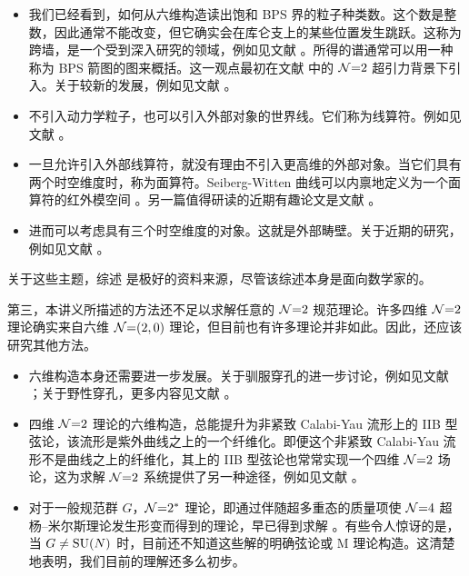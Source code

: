 \begin{itemize}
\item 我们已经看到，如何从六维构造读出饱和 BPS 界的粒子种类数。这个数是整数，因此通常不能改变，但它确实会在库仑支上的某些位置发生跳跃。这称为跨墙，是一个受到深入研究的领域，例如见文献 \cite{Gaiotto:2009hg}。所得的谱通常可以用一种称为 BPS 箭图的图来概括。这一观点最初在文献 \cite{Denef:2002ru} 中的 $\mathcal{N}{=}2$ 超引力背景下引入。关于较新的发展，例如见文献 \cite{Denef:2007vg,Cecotti:2011rv,Manschot:2012rx}。
\item 不引入动力学粒子，也可以引入外部对象的世界线。它们称为线算符。例如见文献 \cite{Drukker:2009tz,Gaiotto:2010be}。
\item 一旦允许引入外部线算符，就没有理由不引入更高维的外部对象。当它们具有两个时空维度时，称为面算符。Seiberg-Witten 曲线可以内禀地定义为一个面算符的红外模空间 \cite{Gaiotto:2009fs}。另一篇值得研读的近期有趣论文是文献 \cite{Gaiotto:2013sma}。
\item 进而可以考虑具有三个时空维度的对象。这就是外部畴壁。关于近期的研究，例如见文献 \cite{Dimofte:2013lba}。
\end{itemize}
关于这些主题，综述 \cite{MooreReview} 是极好的资料来源，尽管该综述本身是面向数学家的。

第三，本讲义所描述的方法还不足以求解任意的 $\mathcal{N}{=}2$ 规范理论。许多四维 $\mathcal{N}{=}2$ 理论确实来自六维 $\mathcal{N}{=}(2,0)$ 理论，但目前也有许多理论并非如此。因此，还应该研究其他方法。
\begin{itemize}
\item 六维构造本身还需要进一步发展。关于驯服穿孔的进一步讨论，例如见文献 \cite{Chacaltana:2010ks,Chacaltana:2012ch,Chacaltana:2013oka}；关于野性穿孔，更多内容见文献 \cite{Xie:2012hs,Xie:2013jc}。
\item 四维 $\mathcal{N}{=}2$ 理论的六维构造，总能提升为非紧致 Calabi-Yau 流形上的 IIB 型弦论，该流形是紫外曲线之上的一个纤维化。即便这个非紧致 Calabi-Yau 流形不是曲线之上的纤维化，其上的 IIB 型弦论也常常实现一个四维 $\mathcal{N}{=}2$ 场论，这为求解 $\mathcal{N}{=}2$ 系统提供了另一种途径，例如见文献 \cite{Tachikawa:2011yr,Cecotti:2012sf}。
\item 对于一般规范群 $G$，$\mathcal{N}{=}2^*$ 理论，即通过伴随超多重态的质量项使 $\mathcal{N}{=}4$ 超杨--米尔斯理论发生形变而得到的理论，早已得到求解 \cite{D'Hoker:1999ft}。有些令人惊讶的是，当 $G\neq\mathop{\mathrm{SU}}(N)$ 时，目前还不知道这些解的明确弦论或 M 理论构造。这清楚地表明，我们目前的理解还多么初步。
\end{itemize}

